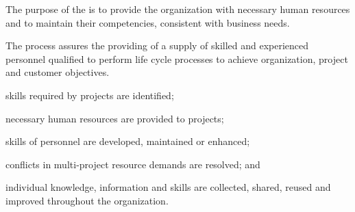 			\begin{adjustwidth}{2em}{0pt} 
				
				The purpose of the  is to provide the organization with necessary human resources and to maintain their competencies, consistent with business needs. 

				The process assures the providing of a supply of skilled and experienced personnel qualified to perform life cycle processes to achieve organization, project and customer objectives.

			\end{adjustwidth}

			\begin{adjustwidth}{2em}{0pt} 

				\begin{compactitem}

					\item skills required by projects are identified;

					\item necessary human resources are provided to projects;

					\item skills of personnel are developed, maintained or enhanced;

					\item conflicts in multi-project resource demands are resolved; and

					\item individual knowledge, information and skills are collected, shared, reused and improved throughout the organization.

				\end{compactitem}

			\end{adjustwidth}

